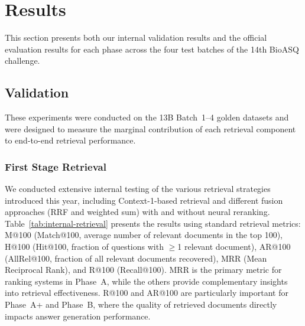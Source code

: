 \section{Results}
\label{sec:results}

This section presents both our internal validation results and the official evaluation results for each phase across the four test batches of the 14th BioASQ challenge.

\subsection{Validation}

These experiments were conducted on the 13B Batch~1--4 golden datasets and were designed to measure the marginal contribution of each retrieval component to end-to-end retrieval performance.

\subsubsection{First Stage Retrieval}
\label{sec:internal-retrieval}

We conducted extensive internal testing of the various retrieval strategies introduced this year, including Context-1-based retrieval and different fusion approaches (RRF and weighted sum) with and without neural reranking. Table~\ref{tab:internal-retrieval} presents the results using standard retrieval metrics: M@100 (Match@100, average number of relevant documents in the top 100), H@100 (Hit@100, fraction of questions with $\ge$1 relevant document), AR@100 (AllRel@100, fraction of all relevant documents recovered), MRR (Mean Reciprocal Rank), and R@100 (Recall@100). MRR is the primary metric for ranking systems in Phase~A, while the others provide complementary insights into retrieval effectiveness. R@100 and AR@100 are particularly important for Phase~A+ and Phase~B, where the quality of retrieved documents directly impacts answer generation performance.

